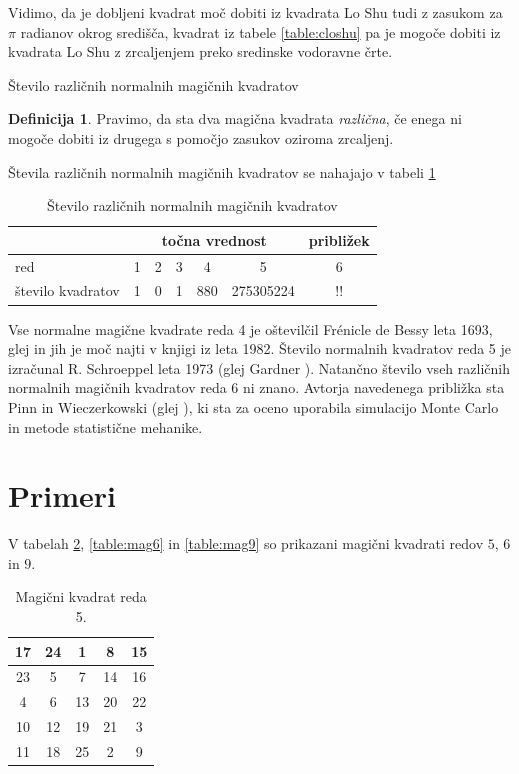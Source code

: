 \documentclass[a4paper,12pt]{article}
\theoremstyle{definition}
\newtheorem{definicija}{Definicija}
\newenvironment{magic}[3]{
    \begin{table}[h]
        \centering
        \caption{#1}
        \label{#3}
        \large
        \begin{tabular}{|*{#2}{c|}}
            \hline
            }
            {
        \end{tabular}
        \normalsize
    \end{table}
}
\newcommand{\pojem}[1]{\emph{\color{purple}#1}}
\begin{document}
Vidimo, da je dobljeni kvadrat moč dobiti iz kvadrata Lo Shu tudi z zasukom za $\pi$ radianov okrog središča, kvadrat iz tabele \ref{table:closhu} pa je mogoče dobiti iz kvadrata Lo Shu z zrcaljenjem preko sredinske vodoravne črte.

Število različnih normalnih magičnih kvadratov

\begin{definicija}
      Pravimo, da sta dva magična kvadrata \pojem{različna}, če enega ni mogoče dobiti
      iz drugega s pomočjo zasukov oziroma zrcaljenj.
\end{definicija}

Števila različnih normalnih magičnih kvadratov se nahajajo v tabeli \ref{table:stevila}

\begin{table}
    \centering
    \caption{Število različnih normalnih magičnih kvadratov}
    \begin{tabular}{lcccccc}
        \toprule
            & \multicolumn{5}{c}{točna vrednost} & približek \\\hline
        red & 1 & 2 & 3 & 4 & 5 & 6 \\
        število kvadratov & 1 & 0 & 1 & 880 & 275305224 & !! \\\hline
    \end{tabular}
    \label{table:stevila}
\end{table}

Vse normalne magične kvadrate reda 4 je oštevilčil Frénicle de Bessy
leta 1693, glej \cite{bessy} in jih je moč najti v knjigi \cite{berlekamp}
iz leta 1982. Število normalnih kvadratov reda 5 je izračunal
R. Schroeppel leta 1973 (glej Gardner \cite{gardner}).
Natančno število vseh različnih normalnih magičnih kvadratov reda 6 ni znano.
Avtorja navedenega približka sta Pinn in Wieczerkowski (glej \cite{pinn}), ki
sta za oceno uporabila simulacijo Monte Carlo in metode statistične mehanike.

\section{Primeri}

V tabelah \ref{table:mag5}, \ref{table:mag6} in \ref{table:mag9} so prikazani magični kvadrati redov $5$, $6$ in $9$.

\begin{magic}{Magični kvadrat reda 5.}{5}{table:mag5}
        17 & 24 &  1 &  8 & 15 \\\hline
        23 &  5 &  7 & 14 & 16 \\\hline
        4 &  6 & 13 & 20 & 22 \\\hline
        10 & 12 & 19 & 21 &  3 \\\hline
        11 & 18 & 25 &  2 &  9 \\\hline
\end{magic}
\end{document}
